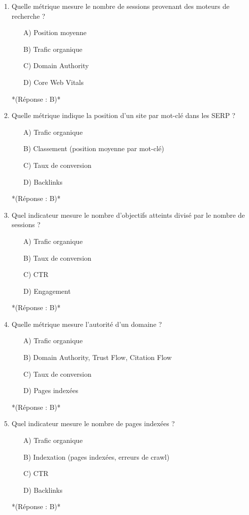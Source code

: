 \documentclass[12pt,a4paper,twoside]{report}
\begin{document}
\begin{enumerate}
    \item Quelle métrique mesure le nombre de sessions provenant des moteurs de recherche ?
    \begin{itemize}
        \item[A)] Position moyenne
        \item[B)] Trafic organique
        \item[C)] Domain Authority
        \item[D)] Core Web Vitals
    \end{itemize}
    *(Réponse : B)*

    \item Quelle métrique indique la position d'un site par mot-clé dans les SERP ?
    \begin{itemize}
        \item[A)] Trafic organique
        \item[B)] Classement (position moyenne par mot-clé)
        \item[C)] Taux de conversion
        \item[D)] Backlinks
    \end{itemize}
    *(Réponse : B)*

    \item Quel indicateur mesure le nombre d'objectifs atteints divisé par le nombre de sessions ?
    \begin{itemize}
        \item[A)] Trafic organique
        \item[B)] Taux de conversion
        \item[C)] CTR
        \item[D)] Engagement
    \end{itemize}
    *(Réponse : B)*

    \item Quelle métrique mesure l'autorité d'un domaine ?
    \begin{itemize}
        \item[A)] Trafic organique
        \item[B)] Domain Authority, Trust Flow, Citation Flow
        \item[C)] Taux de conversion
        \item[D)] Pages indexées
    \end{itemize}
    *(Réponse : B)*

    \item Quel indicateur mesure le nombre de pages indexées ?
    \begin{itemize}
        \item[A)] Trafic organique
        \item[B)] Indexation (pages indexées, erreurs de crawl)
        \item[C)] CTR
        \item[D)] Backlinks
    \end{itemize}
    *(Réponse : B)*


\end{enumerate}
\end{document}
